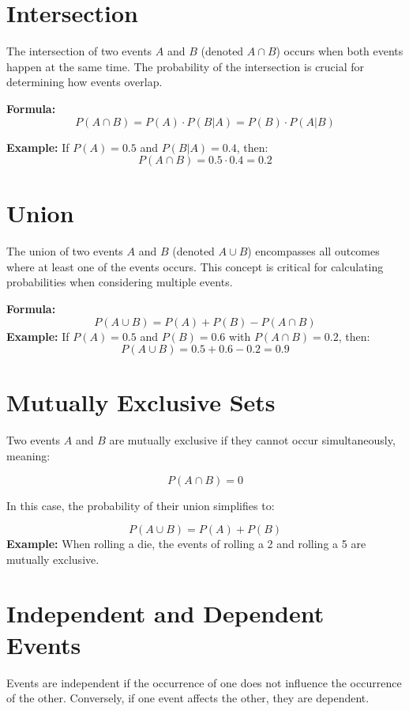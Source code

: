 \documentclass{article}
\begin{document}
\newpage

\section{Intersection}
The intersection of two events \(A\) and \(B\) (denoted \(A \cap B\)) occurs when both events happen at the same time. The probability of the intersection is crucial for determining how events overlap.

\vspace{1em}
\textbf{Formula:}
\[
P(A \cap B) = P(A) \cdot P(B|A) = P(B) \cdot P(A|B)
\]

\textbf{Example:} If \(P(A) = 0.5\) and \(P(B|A) = 0.4\), then:
\[
P(A \cap B) = 0.5 \cdot 0.4 = 0.2
\]

\newpage

\section{Union}
The union of two events \(A\) and \(B\) (denoted \(A \cup B\)) encompasses all outcomes where at least one of the events occurs. This concept is critical for calculating probabilities when considering multiple events.

\vspace{1em}
\textbf{Formula:}
\[
P(A \cup B) = P(A) + P(B) - P(A \cap B)
\]
\vspace{1em}
\textbf{Example:} If \(P(A) = 0.5\) and \(P(B) = 0.6\) with \(P(A \cap B) = 0.2\), then:
\[
P(A \cup B) = 0.5 + 0.6 - 0.2 = 0.9
\]

\newpage

\section{Mutually Exclusive Sets}
Two events \(A\) and \(B\) are mutually exclusive if they cannot occur simultaneously, meaning:

\[
P(A \cap B) = 0
\]

In this case, the probability of their union simplifies to:

\[
P(A \cup B) = P(A) + P(B)
\]
\vspace{1em}
\textbf{Example:} When rolling a die, the events of rolling a 2 and rolling a 5 are mutually exclusive.

\newpage

\section{Independent and Dependent Events}
Events are independent if the occurrence of one does not influence the occurrence of the other. Conversely, if one event affects the other, they are dependent.
\end{document}

